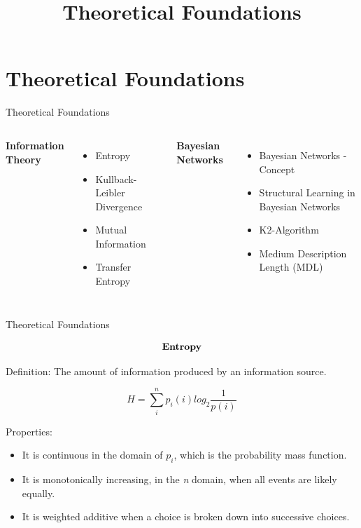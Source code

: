 \section{ Theoretical Foundations}
\title[Theoretical Foundations]{Theoretical Foundations}

\begin{frame}{{Theoretical Foundations}}
     \begin{columns}
            \textbf{Information Theory}
            \begin{itemize}
                \item Entropy
                \item Kullback-Leibler Divergence
                \item Mutual Information
                \item Transfer Entropy
            \end{itemize}

            \textbf{Bayesian Networks}
            \begin{itemize}
                \item Bayesian Networks - Concept
                \item Structural Learning in Bayesian Networks
                \item K2-Algorithm
                \item Medium Description Length (MDL)
            \end{itemize}
	\end{columns}



\end{frame}

\begin{frame}{{Theoretical Foundations}}

	       
	        
	      


\begin{align*}
   \centering \textbf{Entropy}
\end{align*}

Definition: The amount of information produced by an information source.

\begin{equation}
\label{eq:shannon}
    H = \sum_{i}^{n} p_{i}(i)log_{2}\frac{1}{p(i)}
\end{equation}

Properties: 
\begin{itemize}
    \item It is continuous in the domain of $p_i$, which is the probability mass function.
    \item It is monotonically increasing, in the \textit{n} domain, when all events are likely equally.
    \item It is weighted additive when a choice is broken down into successive choices. 
\end{itemize}
\end{frame}

